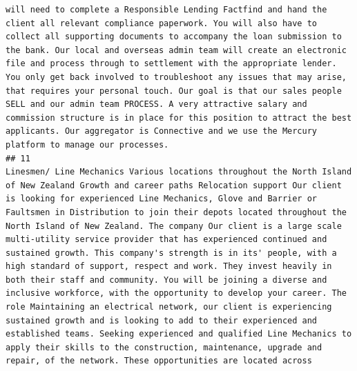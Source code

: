 \documentclass[11pt,a4paper,]{article}
\begin{document}
\begin{verbatim}
will need to complete a Responsible Lending Factfind and hand the client all relevant compliance paperwork. You will also have to collect all supporting documents to accompany the loan submission to the bank. Our local and overseas admin team will create an electronic file and process through to settlement with the appropriate lender. You only get back involved to troubleshoot any issues that may arise, that requires your personal touch. Our goal is that our sales people SELL and our admin team PROCESS. A very attractive salary and commission structure is in place for this position to attract the best applicants. Our aggregator is Connective and we use the Mercury platform to manage our processes.
## 11                                                                                                                                                                                                                                                                                                                                                                                                                                                                                                                                                                                                                                                                                                                                                                                                                                                                                                                                                                                                                                                                                                                                                                                                                                                                                                                                                                                                                                                                                                                                                                                                                                                           Linesmen/ Line Mechanics Various locations throughout the North Island of New Zealand Growth and career paths Relocation support Our client is looking for experienced Line Mechanics, Glove and Barrier or Faultsmen in Distribution to join their depots located throughout the North Island of New Zealand. The company Our client is a large scale multi-utility service provider that has experienced continued and sustained growth. This company's strength is in its' people, with a high standard of support, respect and work. They invest heavily in both their staff and community. You will be joining a diverse and inclusive workforce, with the opportunity to develop your career. The role Maintaining an electrical network, our client is experiencing sustained growth and is looking to add to their experienced and established teams. Seeking experienced and qualified Line Mechanics to apply their skills to the construction, maintenance, upgrade and repair, of the network. These opportunities are located across 
\end{verbatim}
\end{document}
